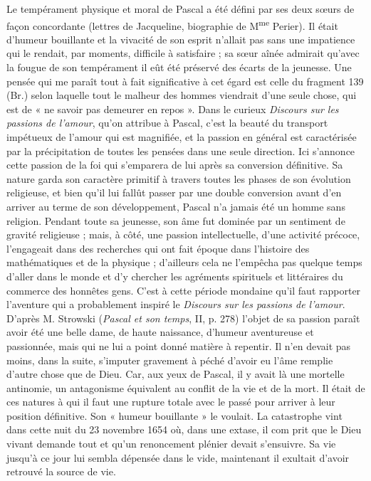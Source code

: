 \documentclass[12pt,a4paper]{article}
\newcommand{\opage}[1]{\marginnote{\footnotesize\textit{[#1]}}}
\begin{document}
Le tempérament physique et moral de Pascal a été défini par ses
deux sœurs de façon concordante (lettres de Jacqueline, biographie
de M\textsuperscript{me} Perier). Il était d'humeur bouillante et la vivacité de son
esprit n'allait pas sans une impatience qui le rendait, par moments,
difficile à satisfaire ; sa sœur aînée admirait qu'avec la fougue de
son tempérament il eût été préservé des écarts de la jeunesse. Une
pensée qui me paraît tout à fait significative à cet égard est celle
du fragment 139 (Br.) selon laquelle tout le malheur des hommes
viendrait d'une seule chose, qui est de « ne savoir pas demeurer
en repos ». Dans le curieux \emph{Discours sur les passions de l'amour},
qu'on attribue à Pascal, c'est la beauté du transport impétueux de
l'amour qui est magnifiée, et la passion en général est caractérisée
par la précipitation de toutes les pensées dans une seule direction.
Ici s'annonce cette passion de la foi qui s'emparera de lui après sa
conversion définitive. Sa nature garda son caractère primitif à
travers toutes les phases de son évolution religieuse, et bien qu'il
lui fallût passer par une double conversion avant d'en arriver au
terme de son développement, Pascal n'a jamais été un homme sans
religion. Pendant toute sa jeunesse, son âme fut dominée par un
sentiment de gravité religieuse ; mais, à côté, une passion intellectuelle,
d'une activité précoce, l'engageait dans des recherches
qui ont fait époque dans l'histoire des mathématiques et de la
physique ; d'ailleurs cela ne l'empêcha pas quelque temps d'aller
dans le monde et d'y chercher les agréments spirituels et littéraires
du commerce des honnêtes gens. C'est à cette période mondaine
qu'il faut rapporter l'aventure qui a probablement inspiré le \emph{Discours
sur les passions de l'amour}. D'après M. Strowski (\emph{Pascal et
son temps}, II, p. 278) l'objet de sa passion paraît avoir été une
belle dame, de haute naissance, d'humeur aventureuse et passionnée,
mais qui ne lui a point donné matière à repentir. Il n'en devait pas
moins, dans la suite, s'imputer gravement à péché d'avoir eu l'âme
remplie d'autre chose que de Dieu. Car, aux yeux de Pascal, il y
avait là une mortelle antinomie, un antagonisme équivalent au
conflit de la vie et de la mort. Il était de ces natures à qui il faut
une rupture totale avec le passé pour arriver à leur position définitive.
Son « humeur bouillante » le voulait. La catastrophe vint
dans cette nuit du 23 novembre 1654 où, dans une extase, il com%
\opage{226}prit que le Dieu vivant demande tout et qu'un renoncement plénier
devait s'ensuivre. Sa vie jusqu'à ce jour lui sembla dépensée dans
le vide, maintenant il exultait d'avoir retrouvé la source de vie.
\end{document}
